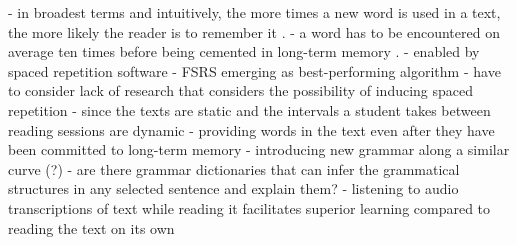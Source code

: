 \documentclass[
	letterpaper, %
]{jdf}
\begin{document}
    - in broadest terms and intuitively, the more times a new word is used in a text, the more likely the reader is to remember it \cite{clockworkorange}.
    - a word has to be encountered on average ten times before being cemented in long-term memory \cite{Nation2020GradedRA}.
    - enabled by spaced repetition software
      - FSRS emerging as best-performing algorithm \cite{shortestpathrepetitionscheduling}
    - have to consider lack of research that considers the possibility of inducing spaced repetition
      - since the texts are static and the intervals a student takes between reading sessions are dynamic
    - providing words in the text even after they have been committed to long-term memory \cite{cepedasrs}
  - introducing new grammar along a similar curve (?)
    - are there grammar dictionaries that can infer the grammatical structures in any selected sentence and explain them?
  - listening to audio transcriptions of text while reading it facilitates superior learning compared to reading the text on its own \cite{Chang2015ImprovingRR}
      
\end{document}
